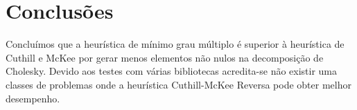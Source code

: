 \section{Conclusões}
Concluímos que a heurística de mínimo grau múltiplo é superior à heurística de
Cuthill e McKee por gerar menos elementos não nulos na decomposição de
Cholesky. Devido aos testes com várias bibliotecas acredita-se não existir uma
classes de problemas onde a heurística Cuthill-McKee Reversa pode obter melhor
desempenho.
